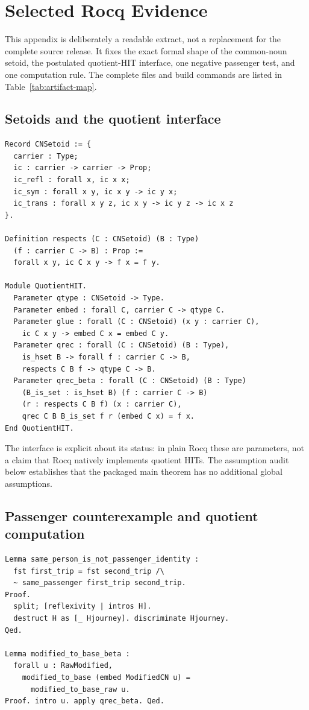 \documentclass[11pt]{article}
\begin{document}
\appendix
\section{Selected Rocq Evidence}

This appendix is deliberately a readable extract, not a replacement for the
complete source release.  It fixes the exact formal shape of the common-noun
setoid, the postulated quotient-HIT interface, one negative passenger test,
and one computation rule.  The complete files and build commands are listed
in Table~\ref{tab:artifact-map}.

\subsection{Setoids and the quotient interface}

\begin{verbatim}
Record CNSetoid := {
  carrier : Type;
  ic : carrier -> carrier -> Prop;
  ic_refl : forall x, ic x x;
  ic_sym : forall x y, ic x y -> ic y x;
  ic_trans : forall x y z, ic x y -> ic y z -> ic x z
}.

Definition respects (C : CNSetoid) (B : Type)
  (f : carrier C -> B) : Prop :=
  forall x y, ic C x y -> f x = f y.

Module QuotientHIT.
  Parameter qtype : CNSetoid -> Type.
  Parameter embed : forall C, carrier C -> qtype C.
  Parameter glue : forall (C : CNSetoid) (x y : carrier C),
    ic C x y -> embed C x = embed C y.
  Parameter qrec : forall (C : CNSetoid) (B : Type),
    is_hset B -> forall f : carrier C -> B,
    respects C B f -> qtype C -> B.
  Parameter qrec_beta : forall (C : CNSetoid) (B : Type)
    (B_is_set : is_hset B) (f : carrier C -> B)
    (r : respects C B f) (x : carrier C),
    qrec C B B_is_set f r (embed C x) = f x.
End QuotientHIT.
\end{verbatim}

The interface is explicit about its status: in plain Rocq these are parameters,
not a claim that Rocq natively implements quotient HITs.  The assumption audit
below establishes that the packaged main theorem has no additional global
assumptions.

\subsection{Passenger counterexample and quotient computation}

\begin{verbatim}
Lemma same_person_is_not_passenger_identity :
  fst first_trip = fst second_trip /\
  ~ same_passenger first_trip second_trip.
Proof.
  split; [reflexivity | intros H].
  destruct H as [_ Hjourney]. discriminate Hjourney.
Qed.

Lemma modified_to_base_beta :
  forall u : RawModified,
    modified_to_base (embed ModifiedCN u) =
      modified_to_base_raw u.
Proof. intro u. apply qrec_beta. Qed.
\end{verbatim}
\end{document}
